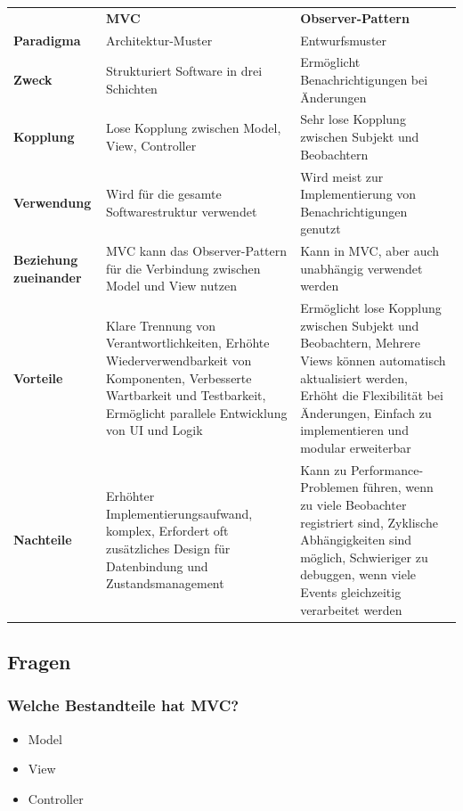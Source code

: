 \documentclass[main.tex]{subfiles}
\begin{document}
\begin{table}[H]
    \centering
    \begin{tabular}{p{2cm} p{5.5cm} p{5.5cm}}
         & \textbf{MVC} & \textbf{Observer-Pattern} \\     
       \textbf{Paradigma}  &  Architektur-Muster & Entwurfsmuster \\ 
       \textbf{Zweck} & Strukturiert Software in drei Schichten & Ermöglicht Benachrichtigungen bei Änderungen \\
       \textbf{Kopplung} & Lose Kopplung zwischen Model, View, Controller & Sehr lose Kopplung zwischen Subjekt und Beobachtern \\
       \textbf{Verwendung} & Wird für die gesamte Softwarestruktur verwendet & Wird meist zur Implementierung von Benachrichtigungen genutzt \\
       \textbf{Beziehung zueinander} & MVC kann das Observer-Pattern für die Verbindung zwischen Model und View nutzen & Kann in MVC, aber auch unabhängig verwendet werden  \\ 
       \textbf{Vorteile} & Klare Trennung von Verantwortlichkeiten, Erhöhte Wiederverwendbarkeit von Komponenten, Verbesserte Wartbarkeit und Testbarkeit, Ermöglicht parallele Entwicklung von UI und Logik & Ermöglicht lose Kopplung zwischen Subjekt und Beobachtern, Mehrere Views können automatisch aktualisiert werden, Erhöht die Flexibilität bei Änderungen, Einfach zu implementieren und modular erweiterbar \\
       \textbf{Nachteile} & Erhöhter Implementierungsaufwand, komplex, Erfordert oft zusätzliches Design für Datenbindung und Zustandsmanagement & Kann zu Performance-Problemen führen, wenn zu viele Beobachter registriert sind, Zyklische Abhängigkeiten sind möglich, Schwieriger zu debuggen, wenn viele Events gleichzeitig verarbeitet werden   
    \end{tabular}
    \label{tab:my_label}
\end{table}

\subsection{Fragen}
\subsubsection*{Welche Bestandteile hat MVC?}
\begin{itemize}
    \item Model
    \item View
    \item Controller
\end{itemize}
\end{document}
